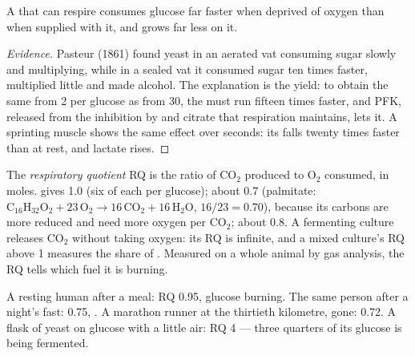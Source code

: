 \begin{proposition}\label{prop:b1:respiration-fermentation:pasteur}
A  that can respire consumes glucose far faster when deprived of
oxygen than when supplied with it, and grows far less on it.
\end{proposition}
\begin{proof}[Evidence]
Pasteur (1861) found yeast in an aerated vat consuming sugar slowly
and multiplying, while in a sealed vat it consumed sugar ten times
faster, multiplied little and made alcohol. The explanation is the 
yield: to obtain the same  from 2 per glucose as from 30, the 
must run  fifteen times faster, and PFK, released from the
inhibition by  and citrate that respiration maintains, lets it. A
sprinting muscle shows the same effect over seconds: its 
falls twenty times faster than at rest, and lactate rises.
\end{proof}

\begin{definition}\label{def:b1:respiration-fermentation:rq}
The \emph{respiratory quotient} RQ is the ratio of $\mathrm{CO_2}$
produced to $\mathrm{O_2}$ consumed, in moles.  gives 1.0
(six of each per glucose);  about 0.7 (palmitate:
$\mathrm{C_{16}H_{32}O_2} + 23\,\mathrm{O_2} \to 16\,\mathrm{CO_2} +
16\,\mathrm{H_2O}$, $16/23 = 0.70$), because its carbons are more
reduced and need more oxygen per $\mathrm{CO_2}$;  about 0.8. A
fermenting culture releases $\mathrm{CO_2}$ without taking oxygen: its
RQ is infinite, and a mixed culture's RQ above 1 measures the share of
. Measured on a whole animal by gas analysis, the RQ tells
which fuel it is burning.
\end{definition}

\begin{example}[Reading an RQ]\label{ex:b1:respiration-fermentation:readrq}
A resting human after a  meal: RQ 0.95, glucose burning.
The same person after a night's fast: 0.75, . A marathon runner at
the thirtieth kilometre,  gone: 0.72. A flask of yeast on
glucose with a little air: RQ 4 --- three quarters of its glucose is
being fermented.
\end{example}

